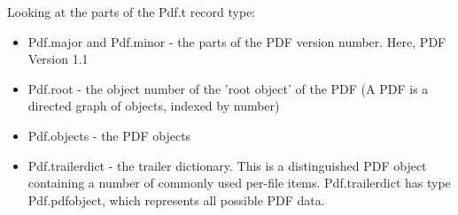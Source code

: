 \documentclass[a4paper]{memoir}
\begin{document}
\noindent Looking at the parts of the \textsf{Pdf.t} record type:
\begin{itemize}
\item \textsf{Pdf.major} and \textsf{Pdf.minor} - the parts of the PDF version number. Here, PDF Version 1.1
\item \textsf{Pdf.root} - the object number of the 'root object' of the PDF (A PDF is a directed graph of objects, indexed by number)
\item \textsf{Pdf.objects} - the PDF objects
\item \textsf{Pdf.trailerdict} - the trailer dictionary. This is a distinguished PDF object containing a number of commonly used per-file items. \textsf{Pdf.trailerdict} has type \textsf{Pdf.pdfobject}, which represents all possible PDF data.
\end{itemize}
\end{document}
